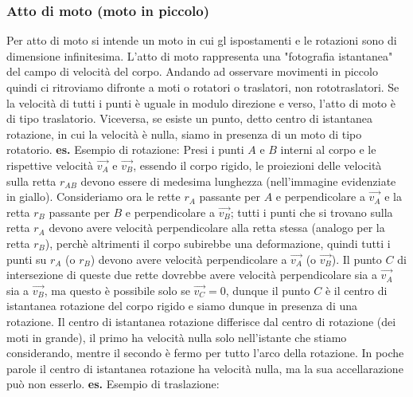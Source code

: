 \subsubsection{Atto di moto (moto in piccolo)}
Per atto di moto si intende un moto in cui gl ispostamenti e le rotazioni sono di dimensione infinitesima. L'atto di moto rappresenta una "fotografia istantanea" del campo di velocità del corpo.\newline
Andando ad osservare movimenti in piccolo quindi ci ritroviamo difronte a moti o rotatori o traslatori, non rototraslatori. Se la velocità di tutti i punti è uguale in modulo direzione e verso, l'atto di moto è di tipo traslatorio. Viceversa, se esiste un punto, detto centro di istantanea rotazione, in cui la velocità è nulla, siamo in presenza di un moto di tipo rotatorio.\newline
\textbf{es.} Esempio di rotazione:\newline
Presi i punti $A$ e $B$ interni al corpo e le rispettive velocità $\vec{v_A}$ e $\vec{v_B}$, essendo il corpo rigido, le proiezioni delle velocità sulla retta $r_{AB}$ devono essere di medesima lunghezza (nell'immagine evidenziate in giallo).\newline
Consideriamo ora le rette $r_A$ passante per $A$ e perpendicolare a $\vec{v_A}$ e la retta $r_B$ passante per $B$ e perpendicolare a $\vec{v_B}$; tutti i punti che si trovano sulla retta $r_A$ devono avere velocità perpendicolare alla retta stessa (analogo per la retta $r_B$), perchè altrimenti il corpo subirebbe una deformazione, quindi tutti i punti su $r_A$ (o $r_B$) devono avere velocità perpendicolare a $\vec{v_A}$ (o $\vec{v_B}$). Il punto $C$ di intersezione di queste due rette dovrebbe avere velocità perpendicolare sia a $\vec{v_A}$ sia a $\vec{v_B}$, ma questo è possibile solo se $\vec{v_C} = 0$, dunque il punto $C$ è il centro di istantanea rotazione del corpo rigido e siamo dunque in presenza di una rotazione.\newline
Il centro di istantanea rotazione differisce dal centro di rotazione (dei moti in grande), il primo ha velocità nulla solo nell'istante che stiamo considerando, mentre il secondo è fermo per tutto l'arco della rotazione. In poche parole il centro di istantanea rotazione ha velocità nulla, ma la sua accellarazione può non esserlo.\newline
\newline
\textbf{es.} Esempio di traslazione:\newline

